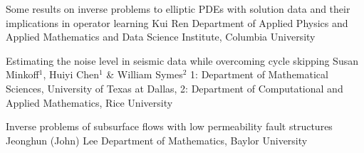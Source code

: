 \begin{talks}
\item\talk
{Some results on inverse problems to elliptic {PDE}s with solution data and their implications in operator learning}
{Kui Ren}
{Department of Applied Physics and Applied Mathematics and Data Science Institute, Columbia University}
\item\talk
{Estimating the noise level in seismic data while overcoming cycle skipping}
{Susan Minkoff$^{1}$, Huiyi Chen$^{1}$ \& William Symes$^{2}$}
{1: Department of Mathematical Sciences, University of Texas at Dallas, 2:  Department of Computational and Applied Mathematics, Rice University}
\item\talk
{Inverse problems of subsurface flows with low permeability fault structures}
{Jeonghun (John) Lee}
{Department of Mathematics, Baylor University}

\end{talks}

